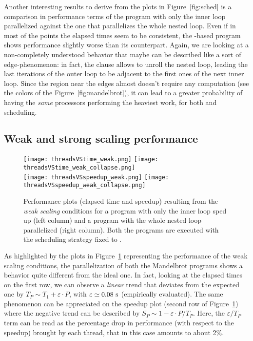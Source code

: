 Another interesting results to derive from the plots in Figure~\ref{fig:sched} is a comparison in performance terms of the program with only the inner loop parallelized against the one that parallelizes the whole nested loop. Even if in most of the points the elapsed times seem to be consistent, the -based program shows performance slightly worse than its counterpart. Again, we are looking at a non-completely understood behavior that maybe can be described like a sort of edge-phenomenon: in fact, the  clause allows to unroll the nested loop, leading the last iterations of the outer loop to be adjacent to the first ones of the next inner loop. Since the region near the edges almost doesn't require any computation (see the colors of the Figure~\ref{fig:mandelbrot}), it can lead to a greater probability of having the \emph{same} processors performing the heaviest work, for both  and  scheduling. 

\subsection{Weak and strong scaling performance}\label{sec:res-scale}

\begin{figure}[b!]
    \centering
    \null\hfill
    \texttt{[image: threadsVStime\_weak.png]}
    \null\hfill
    \texttt{[image: threadsVStime\_weak\_collapse.png]}
    \null\hfill
    \\
    \null\hfill
    \texttt{[image: threadsVSspeedup\_weak.png]}
    \null\hfill
    \texttt{[image: threadsVSspeedup\_weak\_collapse.png]}
    \null\hfill
    \caption{\label{fig:weak_scale}
    Performance plots (elapsed time and speedup) resulting from the \emph{weak scaling} conditions for a program with only the inner loop sped up (left column) and a program with the whole nested loop parallelized (right column). Both the programs are executed with the scheduling strategy fixed to .}
\end{figure}

As highlighted by the plots in Figure~\ref{fig:weak_scale} representing the performance of the weak scaling conditions, the parallelization of both the Mandelbrot programs shows a behavior quite different from the ideal one. In fact, looking at the elapsed times on the first row, we can observe a \emph{linear} trend that deviates from the expected one by $T_P \sim T_1 + \varepsilon \cdot P$, with $\varepsilon \simeq 0.08~\rm{s}$ (empirically evaluated). The same phenomenon can be appreciated on the speedup plot (second row of Figure~\ref{fig:weak_scale}) where the negative trend can be described by $S_P \sim 1 - \varepsilon \cdot P/T_P$. Here, the $\varepsilon/T_P$ term can be read as the percentage drop in performance (with respect to the speedup) brought by each thread, that in this case amounts to about 2\%.

